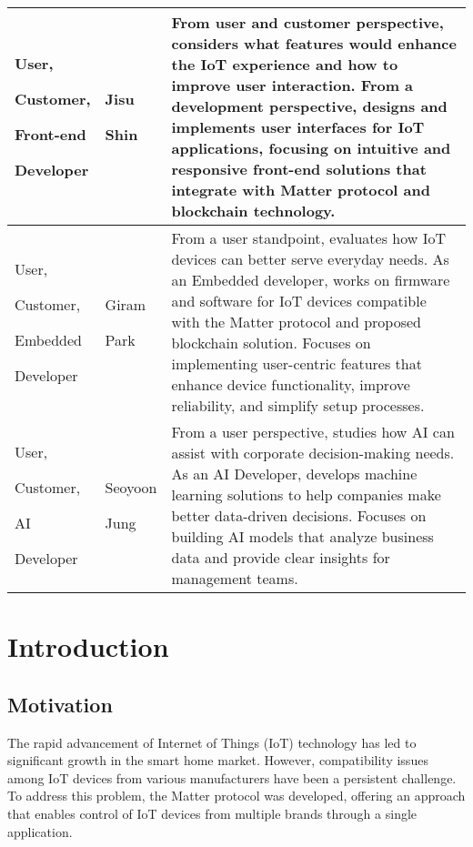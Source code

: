 \documentclass[conference]{IEEEtran}
\begin{document}
\begin{table}
	\def\arraystretch{1.24} \small
	\begin{tabular}{|p{1.8cm}|p{1.4cm}|p{4.4cm}|}
		\hline
		User, \par Customer, \par Front-end \par Developer & Jisu \par Shin    & From user and customer perspective, considers what features would enhance the IoT experience and how to improve user interaction. From a development perspective, designs and implements user interfaces for IoT applications, focusing on intuitive and responsive front-end solutions that integrate with Matter protocol and blockchain technology.                \\
		\hline
		User, \par Customer, \par Embedded \par Developer  & Giram \par Park   & From a user standpoint, evaluates how IoT devices can better serve everyday needs. As an Embedded developer, works on firmware and software for IoT devices compatible with the Matter protocol and proposed blockchain solution. Focuses on implementing user-centric features that enhance device functionality, improve reliability, and simplify setup processes. \\
		\hline
		User, \par Customer, \par AI \par Developer        & Seoyoon \par Jung & From a user perspective, studies how AI can assist with corporate decision-making needs. As an AI Developer, develops machine learning solutions to help companies make better data-driven decisions. Focuses on building AI models that analyze business data and provide clear insights for management teams.                                                       \\
		\hline
	\end{tabular}
\end{table}

\section{Introduction}

\subsection{Motivation}
The rapid advancement of Internet of Things (IoT) technology has led to significant
growth in the smart home market. However, compatibility issues among IoT devices
from various manufacturers have been a persistent challenge. To address this
problem, the Matter protocol was developed, offering an approach that enables
control of IoT devices from multiple brands through a single application.
\end{document}
